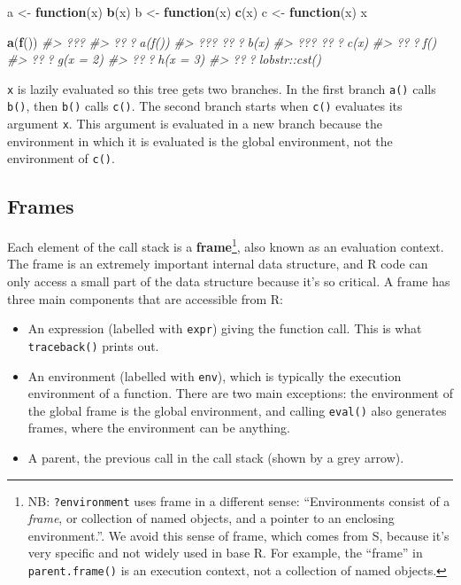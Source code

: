 \documentclass[]{book}
\newenvironment{Shaded}{\begin{snugshade}}{\end{snugshade}}
\newcommand{\CommentTok}[1]{\textcolor[rgb]{0.56,0.35,0.01}{\textit{#1}}}
\newcommand{\ControlFlowTok}[1]{\textcolor[rgb]{0.13,0.29,0.53}{\textbf{#1}}}
\newcommand{\KeywordTok}[1]{\textcolor[rgb]{0.13,0.29,0.53}{\textbf{#1}}}
\newcommand{\NormalTok}[1]{#1}
\newcommand{\StringTok}[1]{\textcolor[rgb]{0.31,0.60,0.02}{#1}}
\let\rmarkdownfootnote\footnote%
\def\footnote{\protect\rmarkdownfootnote}
\theoremstyle{definition}
\theoremstyle{definition}
\theoremstyle{definition}
\theoremstyle{remark}
\begin{document}
\begin{Shaded}
\begin{Highlighting}[]
\NormalTok{a <-}\StringTok{ }\ControlFlowTok{function}\NormalTok{(x) }\KeywordTok{b}\NormalTok{(x)}
\NormalTok{b <-}\StringTok{ }\ControlFlowTok{function}\NormalTok{(x) }\KeywordTok{c}\NormalTok{(x)}
\NormalTok{c <-}\StringTok{ }\ControlFlowTok{function}\NormalTok{(x) x}

\KeywordTok{a}\NormalTok{(}\KeywordTok{f}\NormalTok{())}
\CommentTok{#> ???}
\CommentTok{#> ???a(f())}
\CommentTok{#> ??? ???b(x)}
\CommentTok{#> ???   ???c(x)}
\CommentTok{#> ???f()}
\CommentTok{#>   ???g(x = 2)}
\CommentTok{#>     ???h(x = 3)}
\CommentTok{#>       ???lobstr::cst()}
\end{Highlighting}
\end{Shaded}

\texttt{x} is lazily evaluated so this tree gets two branches. In the
first branch \texttt{a()} calls \texttt{b()}, then \texttt{b()} calls
\texttt{c()}. The second branch starts when \texttt{c()} evaluates its
argument \texttt{x}. This argument is evaluated in a new branch because
the environment in which it is evaluated is the global environment, not
the environment of \texttt{c()}.

\hypertarget{frames}{%
\subsection{Frames}\label{frames}}

Each element of the call stack is a \textbf{frame}\footnote{NB:
  \texttt{?environment} uses frame in a different sense: ``Environments
  consist of a \emph{frame}, or collection of named objects, and a
  pointer to an enclosing environment.''. We avoid this sense of frame,
  which comes from S, because it's very specific and not widely used in
  base R. For example, the ``frame'' in \texttt{parent.frame()} is an
  execution context, not a collection of named objects.}, also known as
an evaluation context. The frame is an extremely important internal data
structure, and R code can only access a small part of the data structure
because it's so critical. A frame has three main components that are
accessible from R:

\begin{itemize}
\item
  An expression (labelled with \texttt{expr}) giving the function call.
  This is what \texttt{traceback()} prints out.
\item
  An environment (labelled with \texttt{env}), which is typically the
  execution environment of a function. There are two main exceptions:
  the environment of the global frame is the global environment, and
  calling \texttt{eval()} also generates frames, where the environment
  can be anything.
\item
  A parent, the previous call in the call stack (shown by a grey arrow).
\end{itemize}
\end{document}
